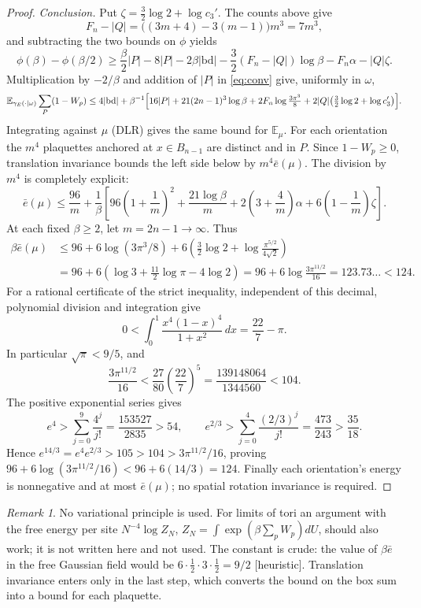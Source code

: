 \documentclass[11pt,a4paper]{article}
\theoremstyle{plain}
\theoremstyle{definition}
\theoremstyle{remark}
\newtheorem{remark}[theorem]{Remark}
\numberwithin{equation}{section}
\newcommand{\E}{\mathbb{E}}
\newcommand{\st}[1]{\textsf{[#1]}}
\begin{document}
\begin{proof}
\emph{Conclusion.} Put $\zeta=\frac32\log2+\log c_3'$. The counts above give
\[
F_n-|Q|=\bigl((3m+4)-3(m-1)\bigr)m^3=7m^3,
\]
and subtracting the two bounds on $\phi$ yields
\[
\phi(\beta)-\phi(\beta/2)
\ge\frac\beta2|P|-8|P|-2\beta|\mathrm{bd}|
       -\frac32(F_n-|Q|)\log\beta-F_n\alpha-|Q|\zeta.
\]
Multiplication by $-2/\beta$ and addition of $|P|$ in \eqref{eq:conv} give, uniformly in $\omega$,
\[
\E_{\gamma_E(\cdot|\omega)}\sum_P(1-W_p)\le4|\mathrm{bd}|+\beta^{-1}\Bigl[16|P|+21(2n-1)^3\log\beta+2F_n\log\tfrac{3\pi^3}8+2|Q|\bigl(\tfrac32\log2+\log c_3'\bigr)\Bigr].
\]
Integrating against $\mu$ (DLR) gives the same bound for $\E_\mu$.
For each orientation the $m^4$ plaquettes anchored at $x\in B_{n-1}$ are distinct and in $P$.
Since $1-W_p\ge0$, translation invariance bounds the left side below by $m^4\bar e(\mu)$.
The division by $m^4$ is completely explicit:
\[
\bar e(\mu)\le\frac{96}{m}+\frac1\beta\left[
96\left(1+\frac1m\right)^2+\frac{21\log\beta}{m}
 +2\left(3+\frac4m\right)\alpha+6\left(1-\frac1m\right)\zeta\right].
\]
At each fixed $\beta\ge2$, let $m=2n-1\to\infty$. Thus
\[
\begin{split}
\beta\bar e(\mu)
&\le96+6\log(3\pi^3/8)+6\left(\frac32\log2+\log\frac{\pi^{5/2}}{4\sqrt2}\right)\\
&=96+6\left(\log3+\frac{11}{2}\log\pi-4\log2\right)
 =96+6\log\frac{3\pi^{11/2}}{16}
 =123.73\ldots<124.
\end{split}
\]
For a rational certificate of the strict inequality, independent of this decimal, polynomial division and integration give
\[
0<\int_0^1\frac{x^4(1-x)^4}{1+x^2}\,dx=\frac{22}{7}-\pi.
\]
In particular $\sqrt\pi<9/5$, and
\[
\frac{3\pi^{11/2}}{16}
 <\frac{27}{80}\left(\frac{22}{7}\right)^5
 =\frac{139148064}{1344560}<104.
\]
The positive exponential series gives
\[
e^4>\sum_{j=0}^9\frac{4^j}{j!}=\frac{153527}{2835}>54,
\qquad
e^{2/3}>\sum_{j=0}^4\frac{(2/3)^j}{j!}=\frac{473}{243}>\frac{35}{18}.
\]
Hence $e^{14/3}=e^4e^{2/3}>105>104>3\pi^{11/2}/16$, proving
$96+6\log(3\pi^{11/2}/16)<96+6(14/3)=124$.
Finally each orientation's energy is nonnegative and at most $\bar e(\mu)$; no spatial rotation invariance is required.
\end{proof}

\begin{remark}
No variational principle is used. For limits of tori an argument with the free energy per site $N^{-4}\log Z_N$,
$Z_N=\int\exp(\beta\sum_pW_p)dU$, should also work; it is not written here and not used. The constant is crude: the value of
$\beta\bar e$ in the free Gaussian field would be $6\cdot\frac12\cdot3\cdot\frac12=9/2$ \st{heuristic}.
Translation invariance enters only in the last step, which converts the bound on the box sum into a bound for each plaquette.
\end{remark}
\end{document}
